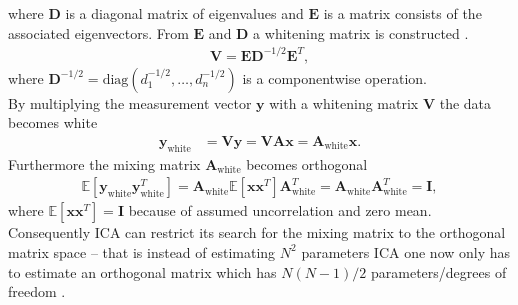 where $\mathbf{D}$ is a diagonal matrix of eigenvalues and $\mathbf{E}$ is a matrix consists of the associated eigenvectors. 
From $\mathbf{E}$ and $\mathbf{D}$ a whitening matrix is constructed \cite[p.159]{ICA}.
\begin{align*}
\mathbf{V} = \mathbf{ED}^{-1/2} \mathbf{E}^T,
\end{align*}
where $\mathbf{D}^{-1/2} = \text{diag}(d_1^{-1/2},\dots, d_n^{-1/2})$ is a componentwise operation.
\\  
By multiplying the measurement vector $\mathbf{y}$ with a whitening matrix $\mathbf{V}$ the data becomes white
\begin{align}
\mathbf{y}_{\text{white}} &= \mathbf{Vy} = \mathbf{VAx} = \mathbf{A}_{\text{white}} \mathbf{x}. \nonumber
\end{align}
Furthermore the mixing matrix $\mathbf{A}_{\text{white}}$ becomes orthogonal 
\begin{align*}
 \mathbb{E}[\mathbf{y}_{\text{white}} \mathbf{y}_{\text{white}}^T] = \mathbf{A}_{\text{white}} \mathbb{E}[\mathbf{xx}^T] \mathbf{A}_{\text{white}}^T = \mathbf{A}_{\text{white}} \mathbf{A}_{\text{white}}^T = \mathbf{I},
 \end{align*} 
where $\mathbb{E}[\mathbf{xx}^T] = \mathbf{I}$ because of assumed uncorrelation and zero mean. Consequently ICA can restrict its search for the mixing matrix to the orthogonal matrix space -- that is instead of estimating $N^2$ parameters ICA one now only has to estimate an orthogonal matrix which has $N(N-1)/2$ parameters/degrees of freedom \cite[p. 159]{ICA}.

